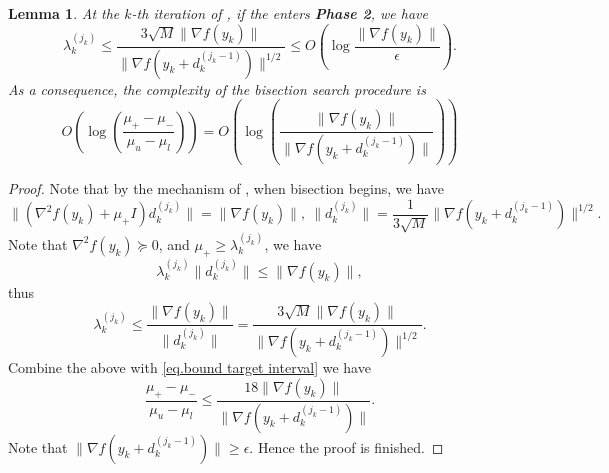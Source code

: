 \documentclass{article}
\theoremstyle{plain}
\newtheorem{lemma}[theorem]{Lemma}
\theoremstyle{definition}
\theoremstyle{remark}
\begin{document}
\begin{lemma}
    \label{lem.bound initial interval appendix}
    At the $k$-th iteration of , if the  enters \textbf{Phase 2}, we have
    \begin{equation*}
        \lambda_k^{(j_k)}\leq \frac{3\sqrt{M}\|\nabla f(y_k)\|}{\|\nabla f(y_k+d_k^{(j_k-1)})\|^{1/2}}\leq O\left(\log\frac{\|\nabla f(y_k)\|}{\epsilon}\right).
    \end{equation*}
    As a consequence, the complexity of the bisection search procedure is
    \begin{equation}
        \label{eq.complexity bisection}
        O \left (\log \left( \frac{\mu_+-\mu_-}{\mu_u-\mu_l}\right)\right)= O\left (\log \left(\frac{\|\nabla f(y_k)\|}{\|\nabla f(y_k+d_k^{(j_k-1)})\|}\right)\right)
    \end{equation}
\end{lemma}
\begin{proof}
    Note that by the mechanism of , when bisection begins, we have
    \begin{equation*}
        \|\left (\nabla^2 f(y_k)+\mu_+ I \right)d_k^{(j_k)}\| =\|\nabla f(y_k)\|, \ \|d_k^{(j_k)}\| =\frac{1}{3\sqrt{M}}\|\nabla f(y_k+d_k^{(j_k-1)})\|^{1/2}.
    \end{equation*}
    Note that $\nabla ^2 f(y_k)\succeq 0$, and $\mu_+ \geq \lambda_k^{(j_k)}$, we have
    \begin{equation*}
        \lambda_k^{(j_k)}\|d_k^{(j_k)}\| \leq \|\nabla f(y_k)\|,
    \end{equation*}
    thus
    \begin{equation*}
        \lambda_k^{(j_k)} \leq \frac{\|\nabla f(y_k)\|}{\|d_k^{(j_k)}\|} = \frac{3\sqrt{M}\|\nabla f(y_k)\|}{\|\nabla f(y_k+d_k^{(j_k-1)})\|^{1/2}}.
    \end{equation*}
    Combine the above with \eqref{eq.bound target interval} we have
    \begin{equation*}
        \frac{\mu_+-\mu_-}{\mu_u-\mu_l} \leq \frac{18\|\nabla f(y_k)\|}{\|\nabla f(y_k+d_k^{(j_k-1)})\|}.
    \end{equation*}
    Note that $\|\nabla f(y_k+d_k^{(j_k-1)})\|\geq \epsilon$. Hence the proof is finished.
\end{proof}
\end{document}
